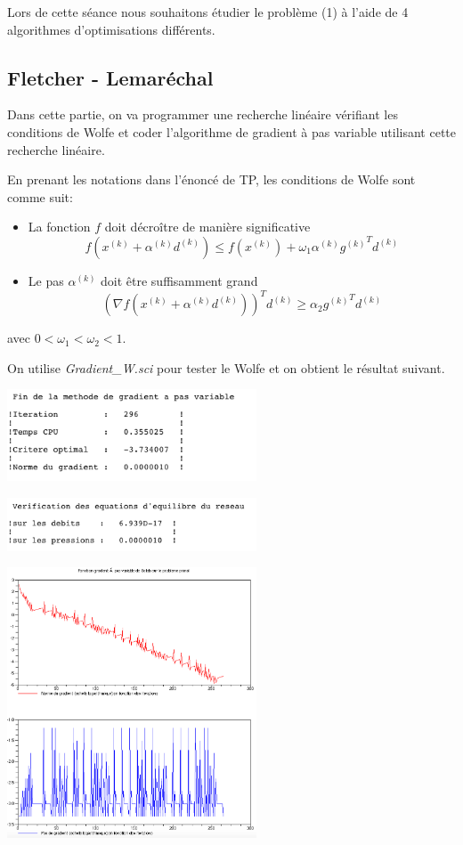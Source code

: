Lors de cette séance nous souhaitons étudier le problème (1) à l'aide de 4 algorithmes d'optimisations différents.

\subsection{Fletcher - Lemaréchal}
 
Dans cette partie, on va programmer une recherche linéaire vérifiant les conditions de Wolfe et coder l’algorithme de gradient à pas variable utilisant cette recherche linéaire.

En prenant les notations dans l'énoncé de TP, les conditions de Wolfe sont comme suit:

\begin{itemize}
\item La fonction $f$ doit décroître de manière significative
  $$f(x^{(k)} + \alpha^{(k)} d^{(k)}) \le f(x^{(k)}) + \omega_1 \alpha^{(k)} {g^{(k)}}^T d^{(k)}$$
\item Le pas $\alpha^{(k)}$ doit être suffisamment grand
  $$(\nabla f(x^{(k)} + \alpha^{(k)} d^{(k)}))^T d^{(k)} \ge \alpha_2 {g^{(k)}}^T d^{(k)}$$
\end{itemize}

avec $0 < \omega_1 < \omega_2 < 1$.

On utilise {\it Gradient\_W.sci} pour tester le Wolfe et on obtient le résultat suivant.

\begin{center}
  \includegraphics[width=20em]{wolfe.png}
  
  \includegraphics[width=20em]{wolfe_v.png}

  \includegraphics[width=20em]{wolfe_f.png}
\end{center}

